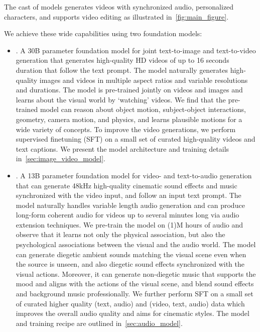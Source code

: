 



  The \OURS cast of models generates videos with synchronized audio, personalized characters, and supports video editing as illustrated in~\cref{fig:main_figure}.

  We achieve these wide capabilities using two foundation models:
  \begin{itemize}
      \item \textbf{\OursVideo}. A 30B parameter foundation model for joint text-to-image and text-to-video generation that generates high-quality HD videos of up to 16 seconds duration that follow the text prompt. The model naturally generates high-quality images and videos in multiple aspect ratios and variable resolutions and durations. The model is pre-trained jointly on \videoDataSize videos and \imageDataSize images and learns about the visual world by `watching' videos. We find that the pre-trained model can reason about object motion, subject-object interactions, geometry, camera motion, and physics, and learns plausible motions for a wide variety of concepts. %
      To improve the video generations, we perform supervised finetuning (SFT) on a small set of curated high-quality videos and text captions. We present the model architecture and training details in~\cref{sec:image_video_model}.

      \item \textbf{\OursAudio}. A 13B parameter foundation model for video- and text-to-audio generation that can generate 48kHz high-quality cinematic sound effects and music synchronized with the video input, and follow an input text prompt.
      The model naturally handles variable length audio generation and can produce long-form coherent audio for videos up to several minutes long via audio extension techniques.
      We pre-train the model on \bigO(1)M hours of audio and observe that it learns not only the physical association, but also the psychological associations between the visual and the audio world.
      The model can generate diegetic ambient sounds matching the visual scene even when the source is unseen, and also diegetic sound effects synchronized with the visual actions.
      Moreover, it can generate non-diegetic music that supports the mood and aligns with the actions of the visual scene, and blend sound effects and background music professionally.
      We further perform SFT on a small set of curated higher quality (text, audio) and (video, text, audio) data which improves the overall audio quality and aims for cinematic styles.
      The model and training recipe are outlined in~\cref{sec:audio_model}.
  \end{itemize}

